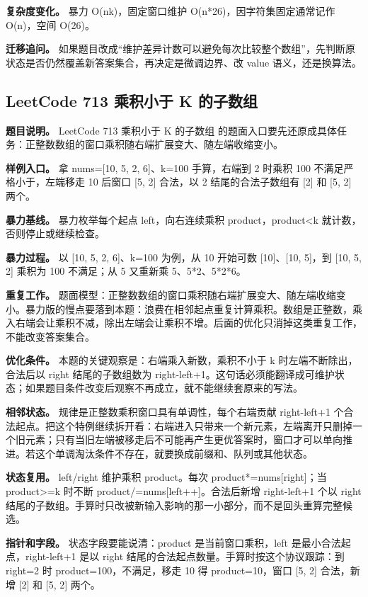 \textbf{复杂度变化。} 暴力 O(nk)，固定窗口维护 O(n*26)，因字符集固定通常记作 O(n)，空间 O(26)。

\textbf{迁移追问。} 如果题目改成“维护差异计数可以避免每次比较整个数组”，先判断原状态是否仍然覆盖新答案集合，再决定是微调边界、改 value 语义，还是换算法。

\subsection{LeetCode 713 乘积小于 K 的子数组}

\textbf{题目说明。} LeetCode 713 乘积小于 K 的子数组 的题面入口要先还原成具体任务：正整数数组的窗口乘积随右端扩展变大、随左端收缩变小。

\textbf{样例入口。} 拿 nums=[10, 5, 2, 6]、k=100 手算，右端到 2 时乘积 100 不满足严格小于，左端移走 10 后窗口 [5, 2] 合法，以 2 结尾的合法子数组有 [2] 和 [5, 2] 两个。

\textbf{暴力基线。} 暴力枚举每个起点 left，向右连续乘积 product，product<k 就计数，否则停止或继续检查。

\textbf{暴力过程。} 以 [10, 5, 2, 6]、k=100 为例，从 10 开始可数 [10]、[10, 5]，到 [10, 5, 2] 乘积为 100 不满足；从 5 又重新乘 5、5*2、5*2*6。

\textbf{重复工作。} 题面模型：正整数数组的窗口乘积随右端扩展变大、随左端收缩变小。暴力版的慢点要落到本题：浪费在相邻起点重复计算乘积。数组是正整数，乘入右端会让乘积不减，除出左端会让乘积不增。后面的优化只消掉这类重复工作，不能改变答案集合。

\textbf{优化条件。} 本题的关键观察是：右端乘入新数，乘积不小于 k 时左端不断除出，合法后以 right 结尾的子数组数为 right-left+1。这句话必须能翻译成可维护状态；如果题目条件改变后观察不再成立，就不能继续套原来的写法。

\textbf{相邻状态。} 规律是正整数乘积窗口具有单调性，每个右端贡献 right-left+1 个合法起点。把这个特例继续拆开看：右端进入只带来一个新元素，左端离开只删掉一个旧元素；只有当旧左端被移走后不可能再产生更优答案时，窗口才可以单向推进。若这个单调淘汰条件不存在，就要换成前缀和、队列或其他状态。

\textbf{状态复用。} left/right 维护乘积 product。每次 product*=nums[right]；当 product>=k 时不断 product/=nums[left++]。合法后新增 right-left+1 个以 right 结尾的子数组。手算时只改被新输入影响的那一小部分，而不是回头重算完整候选。

\textbf{指针和字段。} 状态字段要能说清：product 是当前窗口乘积，left 是最小合法起点，right-left+1 是以 right 结尾的合法起点数量。手算时按这个协议跟踪：到 right=2 时 product=100，不满足，移走 10 得 product=10，窗口 [5, 2] 合法，新增 [2] 和 [5, 2] 两个。

